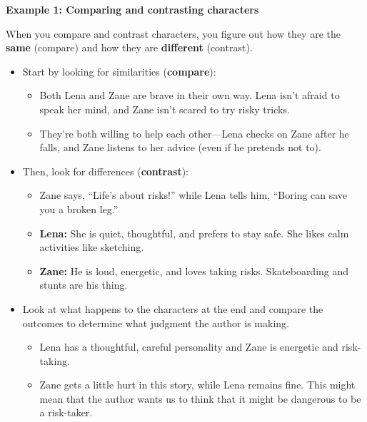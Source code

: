 \documentclass[12pt]{article}
\begin{document}
\begin{tcolorbox}[colframe=black!60, colback=white, 
coltitle=black, colbacktitle=black!15, fonttitle=\bfseries\Large, 
title=Examples, halign title=center, left=10pt, right=10pt, top=10pt, bottom=15pt]

\textbf{Example 1: Comparing and contrasting  characters}


When you compare and contrast characters, you figure out how they are the \textbf{same} (compare) and how they are \textbf{different} (contrast).  
\begin{itemize}
    \item Start by looking for similarities (\textbf{compare}):
    \begin{itemize}
        \item Both Lena and Zane are brave in their own way. Lena isn’t afraid to speak her mind, and Zane isn’t scared to try risky tricks.
    \end{itemize}
    \begin{itemize}
        \item They’re both willing to help each other—Lena checks on Zane after he falls, and Zane listens to her advice (even if he pretends not to).
    \end{itemize}
   \item Then, look for differences (\textbf{contrast}):
   \begin{itemize}
       \item Zane says, “Life’s about risks!” while Lena tells him, “Boring can save you a broken leg.” 
    \item \textbf{Lena:} She is quiet, thoughtful, and prefers to stay safe. She likes calm activities like sketching.
    \item \textbf{Zane:} He is loud, energetic, and loves taking risks. Skateboarding and stunts are his thing. 
   \end{itemize}
   \item Look at what happens to the characters at the end and compare the outcomes to determine what judgment the author is making.
   \begin{itemize}
       \item Lena has a thoughtful, careful personality and Zane is energetic and risk-taking.
       \item Zane gets a little hurt in this story, while Lena remains fine. This might mean that the author wants us to think that it might be dangerous to be a risk-taker.


   \end{itemize}
   
\end{itemize}


 





     \end{tcolorbox}
\vspace{1em}
\end{document}
